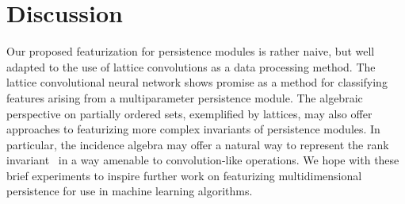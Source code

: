 \documentclass{article}
\begin{document}
\section{Discussion}
Our proposed featurization for persistence modules is rather naive, but well
adapted to the use of lattice convolutions as a data processing method. The
lattice convolutional neural network shows promise as a method for classifying
features arising from a multiparameter persistence module. The algebraic
perspective on partially ordered sets, exemplified by lattices, may also offer
approaches to featurizing more complex invariants of persistence modules. In
particular, the incidence algebra may offer a natural way to represent the rank
invariant~\cite{carlsson_theory_2009} in a way amenable to convolution-like
operations.
We hope with these brief experiments to inspire further work on featurizing
multidimensional persistence for use in machine learning algorithms.

\newpage
\small


\end{document}
